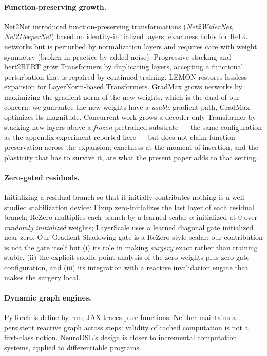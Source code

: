 \documentclass[11pt,a4paper]{article}
\begin{document}
\paragraph{Function-preserving growth.} Net2Net \cite{net2net} introduced function-preserving transformations (\emph{Net2WiderNet}, \emph{Net2DeeperNet}) based on identity-initialized layers; exactness holds for ReLU networks but is perturbed by normalization layers and requires care with weight symmetry (broken in practice by added noise). Progressive stacking \cite{stacking} and bert2BERT \cite{bert2bert} grow Transformers by duplicating layers, accepting a functional perturbation that is repaired by continued training. LEMON \cite{lemon} restores lossless expansion for LayerNorm-based Transformers. GradMax \cite{gradmax} grows networks by maximizing the gradient norm of the new weights, which is the dual of our concern: we guarantee the new weights have a \emph{usable} gradient path, GradMax optimizes its magnitude. Concurrent work grows a decoder-only Transformer by stacking new layers above a \emph{frozen} pretrained substrate \cite{frozensubstrate} --- the same configuration as the appendix experiment reported here --- but does not claim function preservation across the expansion; exactness at the moment of insertion, and the plasticity that has to survive it, are what the present paper adds to that setting.

\paragraph{Zero-gated residuals.} Initializing a residual branch so that it initially contributes nothing is a well-studied stabilization device: Fixup \cite{fixup} zero-initializes the last layer of each residual branch; ReZero \cite{rezero} multiplies each branch by a learned scalar $\alpha$ initialized at $0$ over \emph{randomly initialized} weights; LayerScale \cite{layerscale} uses a learned diagonal gate initialized near zero. Our Gradient Shadowing gate is a ReZero-style scalar; our contribution is not the gate itself but (i) its role in making \emph{surgery} exact rather than training stable, (ii) the explicit saddle-point analysis of the zero-weights-plus-zero-gate configuration, and (iii) its integration with a reactive invalidation engine that makes the surgery local.

\paragraph{Dynamic graph engines.} PyTorch \cite{pytorch} is define-by-run; JAX \cite{jax} traces pure functions. Neither maintains a persistent reactive graph across steps: validity of cached computation is not a first-class notion. NeuroDSL's design is closer to incremental computation systems, applied to differentiable programs.
\end{document}
